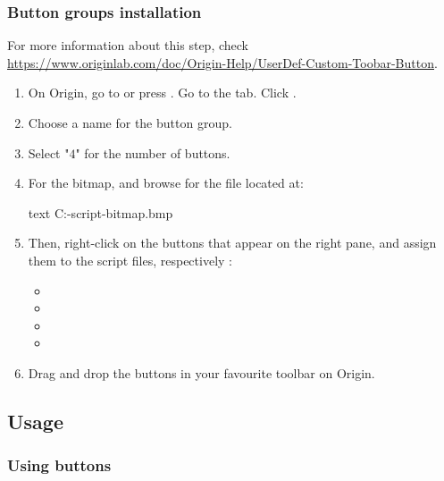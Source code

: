 \documentclass[a4paper, 11pt, raggedright, parskip, sans, colorful]{tufte-style-article}
\begin{document}
\subsubsection{Button groups installation}

For more information about this step, check \url{https://www.originlab.com/doc/Origin-Help/UserDef-Custom-Toobar-Button}.

\begin{enumerate}
\item On Origin, go to  or press . Go to the  tab. Click .

\item Choose a name for the button group.

\item Select "$4$" for the number of buttons.

\item For the bitmap, and browse for the file located at:
\begin{codebox}{text}
C:\ProgramFiles\OriginLab{}\tgmsplot-script\button-bitmap\bitmap.bmp
\end{codebox}

\item Then, right-click on the buttons that appear on the right pane, and assign them to the script files, respectively :
\begin{itemize}
    \item {}
    \item {}
    \item {}
    \item {}
\end{itemize}

\item Drag and drop the buttons in your favourite toolbar on Origin.

\end{enumerate}


\subsection{Usage}

\subsubsection{Using buttons}
\end{document}
